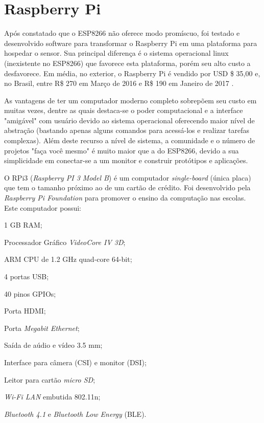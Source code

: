 
\section{Raspberry Pi}
\label{sec:Raspberry-Pi}

Após constatado que o ESP8266 não oferece modo promíscuo, foi testado e
desenvolvido software para transformar o Raspberry Pi em uma plataforma para
hospedar o sensor. Sua principal diferença é o sistema operacional linux
(inexistente no ESP8266) que favorece esta plataforma, porém seu alto custo a
desfavorece. Em média, no exterior, o Raspberry Pi é vendido por USD \$ 35,00
\cite{RPI2016} e, no Brasil, entre R\$ 270 em Março de 2016 e R\$ 190 em Janeiro
de 2017 \cite{rpi3-mercadolivre}.

As vantagens de ter um computador moderno completo sobrepõem seu custo em muitas
vezes, dentre as quais destaca-se o poder computacional e a interface "amigável"  com usuário devido ao
sistema operacional oferecendo maior nível de abstração (bastando apenas alguns
comandos para acessá-los e realizar tarefas complexas).
Além deste recurso a nível de sistema, a comunidade e o número de projetos "faça
você mesmo"  é muito maior que a do ESP8266, devido a sua simplicidade em
conectar-se a um monitor e construir protótipos e aplicações.

O RPi3 (\emph{Raspberry PI 3 Model B}) é um computador \emph{single-board}  (única
placa) que tem o tamanho próximo ao de um cartão de crédito. Foi desenvolvido
pela \emph{Raspberry Pi Foundation} para promover o ensino da computação nas
escolas. Este computador possui:


\begin{alineas}
	\item 1 GB RAM;

	\item Processador Gráfico \emph{VideoCore IV 3D};

	\item ARM CPU de 1.2 GHz quad-core 64-bit;

	\item 4 portas USB;

	\item 40 pinos GPIOs;

	\item Porta HDMI;

	\item Porta \emph{Megabit Ethernet};

	\item Saída de aúdio e vídeo 3.5 mm;

	\item Interface para câmera (CSI) e monitor (DSI);

	\item Leitor para cartão \emph{micro SD};

	\item \emph{Wi-Fi LAN} embutida 802.11n;

	\item \emph{Bluetooth 4.1} e \emph{Bluetooth Low Energy} (BLE).

\end{alineas}

